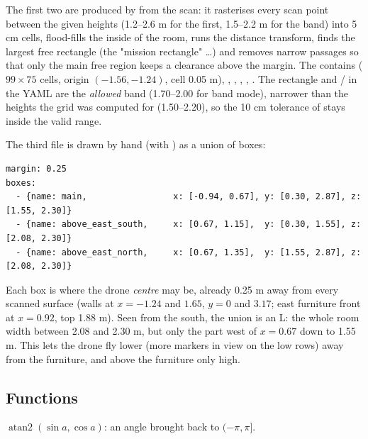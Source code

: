 The first two are produced by  from the scan: it rasterises every scan point between
the given heights (1.2--2.6 m for the first, 1.5--2.2 m for the band) into 5 cm cells, flood-fills the inside of the
room, runs the distance transform, finds the largest free rectangle (the "mission rectangle" \dots) and
removes narrow passages so that only the main free region keeps a clearance above the margin. The 
contains  ($99\times75$ cells, origin $(-1.56, -1.24)$, cell 0.05 m), , ,
, , . The rectangle and / in the YAML are the
\emph{allowed} band (1.70--2.00 for band mode), narrower than the heights the grid was computed for (1.50--2.20),
so the 10 cm tolerance of  stays inside the valid range.

The third file is drawn by hand (with ) as a union of boxes:
\begin{lstlisting}
margin: 0.25
boxes:
  - {name: main,                 x: [-0.94, 0.67], y: [0.30, 2.87], z: [1.55, 2.30]}
  - {name: above_east_south,     x: [0.67, 1.15],  y: [0.30, 1.55], z: [2.08, 2.30]}
  - {name: above_east_north,     x: [0.67, 1.35],  y: [1.55, 2.87], z: [2.08, 2.30]}
\end{lstlisting}
Each box is where the drone \emph{centre} may be, already 0.25 m away from every scanned surface (walls at
$x=-1.24$ and $1.65$, $y=0$ and $3.17$; east furniture front at $x=0.92$, top 1.88 m). Seen from the south,
the union is an L: the whole room width between 2.08 and 2.30 m, but only the part west of $x=0.67$ down to
1.55 m. This lets the drone fly lower (more markers in view on the low rows) away from the furniture, and above
the furniture only high.

\subsection{Functions}

$\operatorname{atan2}(\sin a, \cos a)$: an angle brought back to $(-\pi,\pi]$.

